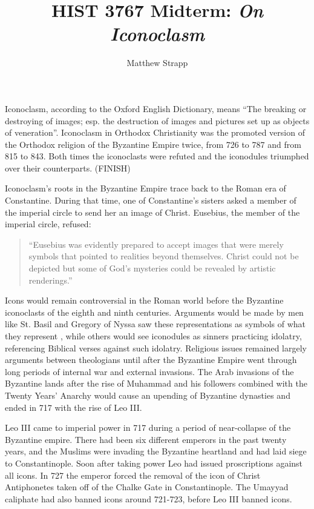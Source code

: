 \documentclass[12pt]{article}
\title{HIST 3767 Midterm: \emph{On Iconoclasm}}
\author{Matthew Strapp}
\begin{document}
\begin{singlespace}
    \maketitle
\end{singlespace}
    Iconoclasm, according to the Oxford English Dictionary, means ``The breaking or destroying of images; esp. the destruction of images and pictures set up as objects of veneration''\cite{oed:iconoclasm}. Iconoclasm in Orthodox Christianity was the promoted version of the Orthodox religion of the Byzantine Empire twice, from 726 to 787 and from 815 to 843. Both times the iconoclasts were refuted and the iconodules triumphed over their counterparts. (FINISH) \

    Iconoclasm's roots in the Byzantine Empire trace back to the Roman era of Constantine. During that time, one of Constantine's sisters asked a member of the imperial circle to send her an image of Christ. Eusebius, the member of the imperial circle, refused:
    \begin{quote}
        ``Eusebius was evidently prepared to accept images that were merely symbols that pointed to realities beyond themselves. Christ could not be depicted but some of God's mysteries could be revealed by artistic renderings.''
        \cite[p. 13]{CarlIcons}
    \end{quote}
    \noindent
    Icons would remain controversial in the Roman world before the Byzantine iconoclasts of the eighth and ninth centuries. Arguments would be made by men like St. Basil and Gregory of Nyssa saw these representations as symbols of what they represent \cite[pp. 16-17]{CarlIcons}, while others would see iconodules as sinners practicing idolatry, referencing Biblical verses against such idolatry. Religious issues remained largely arguments between theologians until after the Byzantine Empire went through long periods of internal war and external invasions. The Arab invasions of the Byzantine lands after the rise of Muhammad and his followers combined with the Twenty Years' Anarchy would cause an upending of Byzantine dynasties and ended in 717 with the rise of Leo III. \
    
    Leo III came to imperial power in 717 during a period of near-collapse of the Byzantine empire. There had been six different emperors in the past 
    twenty years, and the Muslims were invading the Byzantine heartland and had laid siege to Constantinople. Soon after taking power Leo had issued proscriptions against all icons. In 727 the emperor forced the removal of the icon of Christ Antiphonetes taken off of the Chalke Gate in Constantinople. \cite[p. 51]{LeoJour} The Umayyad caliphate had also banned icons around 721-723, before Leo III banned icons.

    
    
\end{document}
